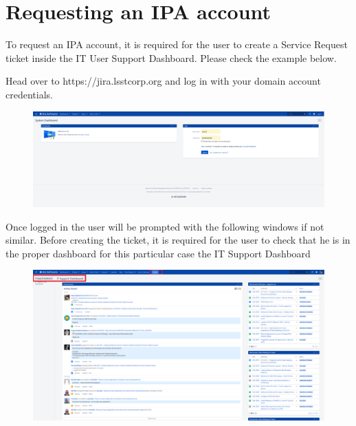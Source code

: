 \section{Requesting an IPA account}
\label{sec:IPA}

  To request an IPA account, it is required for the user to create a Service Request ticket inside the IT User Support Dashboard.
  Please check the example below.

  Head over to https://jira.lsstcorp.org and log in with your domain account credentials.

\vspace{5 mm}

\begin{figure}
  \includegraphics[width=12cm]{Images/example1.png}
\end{figure}

\vspace{5 mm}

Once logged in the user will be prompted with the following windows if not similar. Before creating the ticket,  it is required for the user to check that he is in the proper dashboard for this particular case the IT Support Dashboard

\vspace{5 mm}

\begin{figure}
  \includegraphics[width=12cm]{Images/example2.png}
\end{figure}

\vspace{40 mm}

